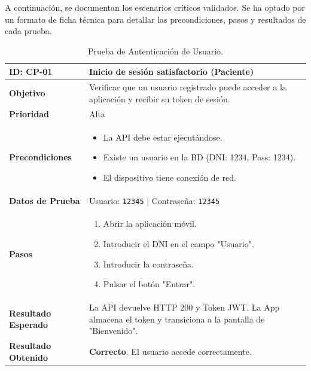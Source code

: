 A continuación, se documentan los escenarios críticos validados. Se ha optado por un formato de ficha técnica para detallar las precondiciones, pasos y resultados de cada prueba.
\renewcommand{\arraystretch}{1.5} %

\begin{table}[H]
    \centering
    \begin{tabularx}{\textwidth}{|l|X|}
        \hline
        \rowcolor{gray!25} \textbf{ID: CP-01} & \textbf{Inicio de sesión satisfactorio (Paciente)} \\ \hline
        \textbf{Objetivo} & Verificar que un usuario registrado puede acceder a la aplicación y recibir su token de sesión. \\ \hline
        \textbf{Prioridad} & Alta \\ \hline
        \textbf{Precondiciones} & 
        \vspace*{-\baselineskip} %
        \begin{itemize}
            \item La API debe estar ejecutándose.
            \item Existe un usuario en la BD (DNI: 1234, Pass: 1234).
            \item El dispositivo tiene conexión de red.
        \end{itemize} \\ \hline
        \textbf{Datos de Prueba} & Usuario: \texttt{12345} | Contraseña: \texttt{12345} \\ \hline
        \textbf{Pasos} & 
        \vspace*{-\baselineskip}
        \begin{enumerate}
            \item Abrir la aplicación móvil.
            \item Introducir el DNI en el campo "Usuario".
            \item Introducir la contraseña.
            \item Pulsar el botón "Entrar".
        \end{enumerate} \\ \hline
        \textbf{Resultado Esperado} & La API devuelve HTTP 200 y Token JWT. La App almacena el token y transiciona a la pantalla de "Bienvenido". \\ \hline
        \textbf{Resultado Obtenido} & \textcolor{green!40!black}{\textbf{Correcto}}. El usuario accede correctamente. \\ \hline
    \end{tabularx}
    \caption{Prueba de Autenticación de Usuario.}
\end{table}

